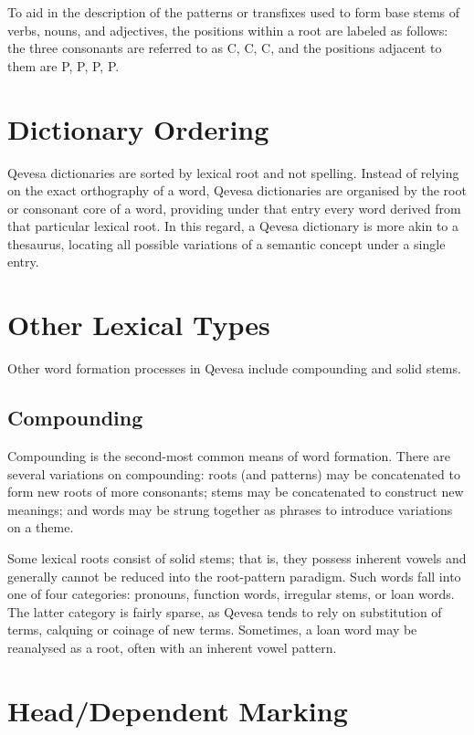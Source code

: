 \documentclass[grammar]{subfiles}
\begin{document}
  To aid in the description of the patterns or transfixes used to form base stems of verbs, nouns, and adjectives, the positions within a root are labeled as follows: the three consonants are referred to as C, C, C, and the positions adjacent to them are P, P, P, P.

  \section{Dictionary Ordering}
  \label{sec:dictionary_ordering}

  Qevesa dictionaries are sorted by lexical root and not spelling. Instead of relying on the exact orthography of a word, Qevesa dictionaries are organised by the root or consonant core of a word, providing under that entry every word derived from that particular lexical root. In this regard, a Qevesa dictionary is more akin to a thesaurus, locating all possible variations of a semantic concept under a single entry.

  \section{Other Lexical Types}
  \label{sec:other_lexical_types}

  Other word formation processes in Qevesa include compounding and solid stems.

  \subsection{Compounding}
  \label{ssec:morph_compounding}

  Compounding is the second-most common means of word formation. There are several variations on compounding: roots (and patterns) may be concatenated to form new roots of more consonants; stems may be concatenated to construct new meanings; and words may be strung together as phrases to introduce variations on a theme.

  Some lexical roots consist of solid stems; that is, they possess inherent vowels and generally cannot be reduced into the root-pattern paradigm. Such words fall into one of four categories: pronouns, function words, irregular stems, or loan words. The latter category is fairly sparse, as Qevesa tends to rely on substitution of terms, calquing or coinage of new terms. Sometimes, a loan word may be reanalysed as a root, often with an inherent vowel pattern.

  \section{Head/Dependent Marking}
  \label{sec:head_dependent_marking}
\end{document}
